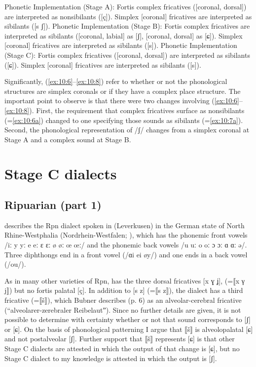 \eanoraggedright%
\label{ex:10:6}Phonetic Implementation (Stage A):
\ea\label{ex:10:6a} Fortis complex fricatives ([coronal, dorsal]) are interpreted as nonsibilants ([ç]).
\ex\label{ex:10:6b} Simplex [coronal] fricatives are interpreted as sibilants ([s ʃ]).
\z 
\ex%
\label{ex:10:7}Phonetic Implementation (Stage B):
\ea\label{ex:10:7a} Fortis complex fricatives are interpreted as sibilants ([coronal, labial] as [ʃ], [coronal, dorsal] as [ɕ]).
\ex\label{ex:10:7b} Simplex [coronal] fricatives are interpreted as sibilants ([s]).
\z 
\ex%
\label{ex:10:8}Phonetic Implementation (Stage C):
\ea\label{ex:10:8a} Fortis complex fricatives ([coronal, dorsal]) are interpreted as sibilants ([ɕ]).
\ex\label{ex:10:8b} Simplex [coronal] fricatives are interpreted as sibilants ([s]).
\z 
\z 

Significantly, (\ref{ex:10:6}--\ref{ex:10:8}) refer to whether or not the phonological structures are simplex coronals or if they have a complex place structure. The important point to observe is that there were two changes involving (\ref{ex:10:6}--\ref{ex:10:8}). First, the requirement that complex fricatives surface as nonsibilants (=\ref{ex:10:6a}) changed to one specifying those sounds as sibilants (=\ref{ex:10:7a}). Second, the phonological representation of /ʃ/ changes from a simplex coronal at Stage A and a complex sound at Stage B.

\section{{Stage} {C} {dialects}}\label{sec:10.3}

\subsection{Ripuarian (part 1)}\label{sec:10.3.1}

\citet{Bubner1935} describes the Rpn dialect spoken in  (Leverkusen) in the German state of North Rhine-Westphalia (Nordrhein-Westfalen; ), which has the phonemic front vowels /iː y yː e eː ɛ ɛː ø øː œ œː/ and the phonemic back vowels /u uː o oː ɔ ɔː ɑ ɑː ə/. Three diphthongs end in a front vowel (/ɑi ei øy/) and one ends in a back vowel (/ou/).

As in many other varieties of Rpn,  has the three dorsal fricatives [x ɣ ʝ], (=⟦x γ j⟧) but no fortis palatal [ç]. In addition to [s z] (=⟦s z⟧), the dialect has a third  fricative (=⟦š⟧), which Bubner describes (p. 6) as an alveolar-cerebral fricative (“alveolarer-zerebraler Reibelautˮ). Since no further details are given, it is not possible to determine with certainty whether or not that sound corresponds to [ʃ] or [ɕ]. On the basis of phonological patterning I argue that ⟦š⟧ is alveolopalatal [ɕ] and not postalveolar [ʃ].  Further support that ⟦š⟧ represents [ɕ] is that other Stage C dialects are attested in which the output of that change is [ɕ], but no Stage C dialect to my knowledge is attested in which the output is [ʃ].

